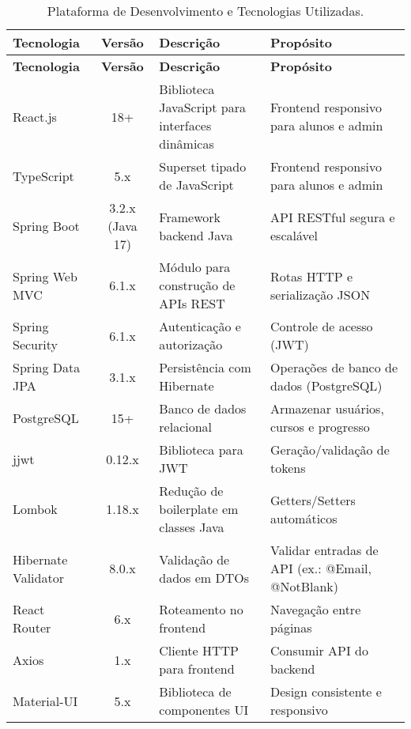 \begin{footnotesize}
\begin{longtable}{|p{1.8cm}|c|p{5cm}|p{6.3cm}|}
	\caption{Plataforma de Desenvolvimento e Tecnologias Utilizadas.}	
	\label{tabela-plataforma}\\\hline

	\rowcolor{lightgray}
	\textbf{Tecnologia} & \textbf{Versão} & \textbf{Descrição} & \textbf{Propósito} \\\hline 
	\endfirsthead
	\hline
	\rowcolor{lightgray}
	\textbf{Tecnologia} & \textbf{Versão} & \textbf{Descrição} & \textbf{Propósito} \\\hline 
	\endhead
		
	React.js & 18+ & Biblioteca JavaScript para interfaces dinâmicas & Frontend responsivo para alunos e admin \\ \hline
	
	TypeScript & 5.x & Superset tipado de JavaScript & Frontend responsivo para alunos e admin \\ \hline
	
	Spring Boot & 3.2.x (Java 17) & Framework backend Java & API RESTful segura e escalável \\ \hline
	
	Spring Web MVC & 6.1.x & Módulo para construção de APIs REST & Rotas HTTP e serialização JSON \\ \hline
	
	Spring Security & 6.1.x & Autenticação e autorização & Controle de acesso (JWT) \\ \hline
	
	Spring Data JPA & 3.1.x & Persistência com Hibernate & Operações de banco de dados (PostgreSQL) \\ \hline
	
	PostgreSQL & 15+ & Banco de dados relacional & Armazenar usuários, cursos e progresso \\ \hline
	
	jjwt & 0.12.x & Biblioteca para JWT & Geração/validação de tokens \\ \hline
	
	Lombok & 1.18.x & Redução de boilerplate em classes Java & Getters/Setters automáticos \\ \hline
	
	Hibernate Validator & 8.0.x & Validação de dados em DTOs & Validar entradas de API (ex.: @Email, @NotBlank) \\ \hline
	
	React Router & 6.x & Roteamento no frontend & Navegação entre páginas \\ \hline
	
	Axios & 1.x & Cliente HTTP para frontend & Consumir API do backend \\ \hline
	
	Material-UI & 5.x & Biblioteca de componentes UI & Design consistente e responsivo \\ \hline
	
\end{longtable}
\end{footnotesize}






